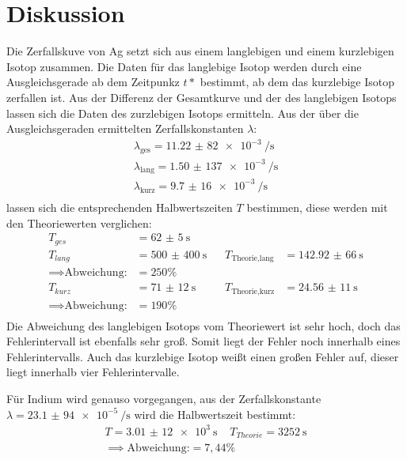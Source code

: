 \section{Diskussion}
\label{sec:Diskussion}
Die Zerfallskuve von Ag setzt sich aus einem langlebigen und einem kurzlebigen
Isotop zusammen. Die Daten für das langlebige Isotop werden durch eine Ausgleichsgerade
ab dem Zeitpunkz $t*$ bestimmt, ab dem das kurzlebige Isotop zerfallen ist.
Aus der Differenz der Gesamtkurve und der des langlebigen Isotops lassen sich die
Daten des zurzlebigen Isotops ermitteln.
Aus der über die Ausgleichsgeraden ermittelten Zerfallskonstanten $\lambda$:
\begin{align*}
  \lambda_{\text{ges}}=\SI{11,22(82)e-3}{\per\s}\\
  \lambda_{\text{lang}}=\SI{1,50(137)e-3}{\per\s}\\
  \lambda_{\text{kurz}}=\SI{9,7(16)e-3}{\per\s}\\
\end{align*}
lassen sich die
entsprechenden Halbwertszeiten $T$ bestimmen, diese werden mit den Theoriewerten verglichen:
\begin{align*}
  T_{ges}&=\SI{62(5)}{\s}\\
  T_{lang}&=\SI{500(400)}{\s}\;\;\;&T_{\text{Theorie,lang}}&=\SI{142,92(66)}{\s}\\
  \implies \text{Abweichung:}&=250\%\\
  T_{kurz}&=\SI{71(12)}{\s}\;\;\;&T_{\text{Theorie,kurz}}&=\SI{24,56(11)}{\s}\\
  \implies \text{Abweichung:}&=190\%\\
\end{align*}
\cite{silber}
Die Abweichung des langlebigen Isotops vom Theoriewert ist sehr hoch, doch das
Fehlerintervall ist ebenfalls sehr groß. Somit liegt der Fehler noch innerhalb eines Fehlerintervalls.
Auch das kurzlebige Isotop weißt einen großen Fehler auf, dieser liegt innerhalb vier
Fehlerintervalle.

Für Indium wird genauso vorgegangen, aus der Zerfallskonstante $\lambda =\SI{23,1(94)e-5}{\per\s}$
wird die Halbwertszeit
bestimmt:
\begin{align*}
  T=\SI{3,01(12)e+3}{\s}\;\;\;\;T_{Theorie}=\SI{3252}{\s}\\
  \implies \text{Abweichung:}=7,44\%\\
\end{align*}
\cite{indium}
